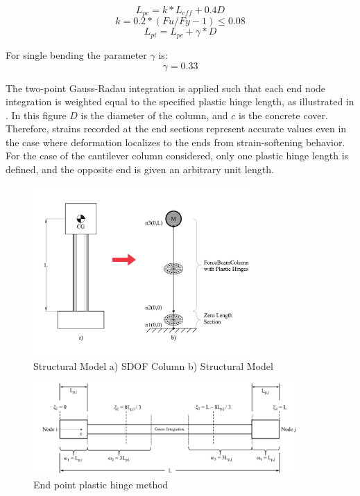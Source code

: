 \begin{equation}
    L_{pc}=k*L_{eff} + 0.4D
    \label{eq:LP_Comp}
\end{equation}
\begin{equation}
	k=0.2*(Fu/Fy - 1) \leqslant 0.08
	\label{eq:K_Lp}
\end{equation}
\begin{equation}
    L_{pt}=L_{pc}+\gamma*D
    \label{eq:LP_Tension}
\end{equation}

For single bending the parameter $\gamma$ is:
\begin{equation}
    \gamma=0.33
    \label{eq:Gamma_LPt}
\end{equation}

The two-point Gauss-Radau integration is applied such that each end node integration is weighted equal to the specified plastic hinge length, as illustrated in . In this figure $D$ is the diameter of the column, and $c$ is the concrete cover. Therefore, strains recorded at the end sections represent accurate values even in the case where deformation localizes to the ends from strain-softening behavior. For the case of the cantilever column considered, only one plastic hinge length is defined, and the opposite end is given an arbitrary unit length. 

\begin{figure}[htbp]
	\centering
	\includegraphics[width=0.75\textwidth]{Chapter-5/figs/StructuralModel_01}
	\caption{Structural Model a) SDOF Column b) Structural Model}
	\label{fig:Structural_Model}
\end{figure}

\begin{figure}[htbp]
	\centering
	\includegraphics[width=0.9\textwidth]{Chapter-5/figs/fbc_PlasticHinge}
	\caption{End point plastic hinge method \cite{Scott}}
	\label{fig:Fiber_PlasticHinge}
\end{figure}


